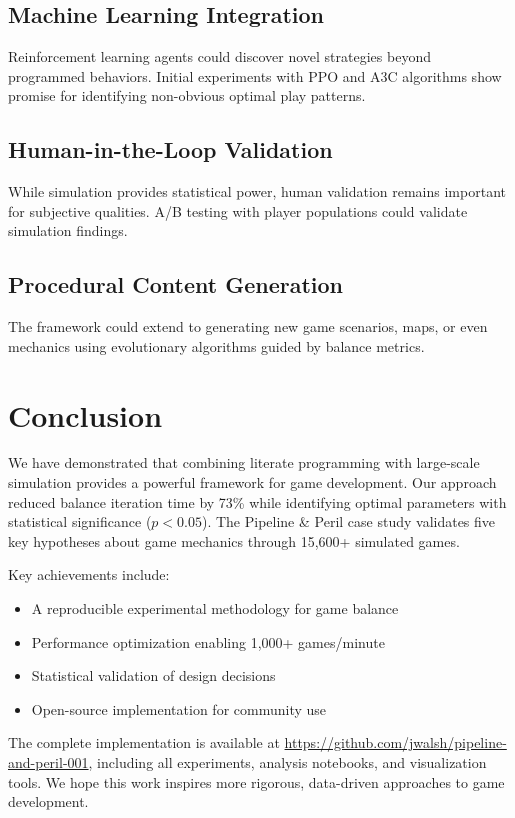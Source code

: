 \documentclass[sigconf]{acmart}
\begin{document}
\subsection{Machine Learning Integration}

Reinforcement learning agents could discover novel strategies beyond programmed behaviors. Initial experiments with PPO and A3C algorithms show promise for identifying non-obvious optimal play patterns.

\subsection{Human-in-the-Loop Validation}

While simulation provides statistical power, human validation remains important for subjective qualities. A/B testing with player populations could validate simulation findings.

\subsection{Procedural Content Generation}

The framework could extend to generating new game scenarios, maps, or even mechanics using evolutionary algorithms guided by balance metrics.

\section{Conclusion}

We have demonstrated that combining literate programming with large-scale simulation provides a powerful framework for game development. Our approach reduced balance iteration time by 73\% while identifying optimal parameters with statistical significance ($p < 0.05$). The Pipeline \& Peril case study validates five key hypotheses about game mechanics through 15,600+ simulated games.

Key achievements include:
\begin{itemize}
\item A reproducible experimental methodology for game balance
\item Performance optimization enabling 1,000+ games/minute
\item Statistical validation of design decisions
\item Open-source implementation for community use
\end{itemize}

The complete implementation is available at \url{https://github.com/jwalsh/pipeline-and-peril-001}, including all experiments, analysis notebooks, and visualization tools. We hope this work inspires more rigorous, data-driven approaches to game development.
\end{document}
